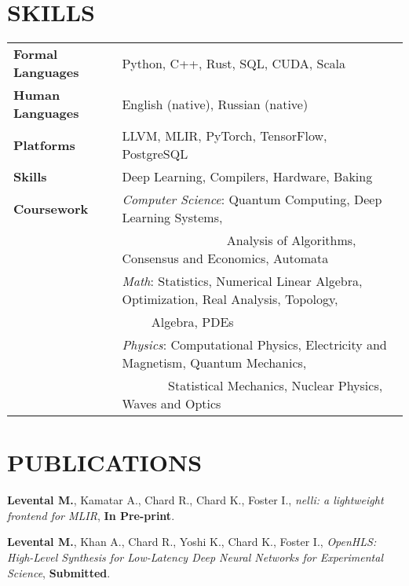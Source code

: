 \documentclass[11pt,letterpaper,roman,colorlinks,linkcolor=blue]{moderncv}
\newcommand*{\modern}{\fontfamily{qhv}\selectfont}
\newcommand{\mystyle}[1]{\textcolor{mygrey}{\modern #1}}
\newcommand{\mysectionstyle}[1]{\large\mystyle{#1}}
\begin{document}
\section{\mysectionstyle{SKILLS}}

\begin{tabular}{ @{} >{\bfseries}l @{\hspace{6ex}} l }
Formal Languages  & Python, C++, Rust, SQL, CUDA, Scala \\
Human Languages  & English (native), Russian (native) \\
Platforms  & LLVM, MLIR, PyTorch, TensorFlow, PostgreSQL \\
Skills     & Deep Learning, Compilers, Hardware, Baking \\
Coursework & \textit{Computer Science}: Quantum Computing, Deep Learning Systems, \\
	   & $\qquad$ $\qquad$ $\qquad$ $\quad$ Analysis of Algorithms, Consensus and Economics, Automata \\
           & \textit{Math}: Statistics, Numerical Linear Algebra, Optimization, Real Analysis, Topology, \\
           & $\qquad$ \hspace{0.5ex} Algebra, PDEs  \\
           & \textit{Physics}: Computational Physics, Electricity and Magnetism, Quantum Mechanics, \\ 
           & $\qquad$ $\quad$ \hspace{0.00ex} Statistical Mechanics, Nuclear Physics, Waves and Optics
\end{tabular}


\section{\mysectionstyle{PUBLICATIONS}}

\begin{hangingpar}
\textbf{Levental M.}, Kamatar A., Chard R., Chard K., Foster I.,
\textit{nelli: a lightweight frontend for MLIR}, 
\textbf{In Pre-print}.
\end{hangingpar}

\begin{hangingpar}
\textbf{Levental M.}, Khan A., Chard R., Yoshi K., Chard K., Foster I.,
\textit{OpenHLS: High-Level Synthesis for Low-Latency Deep Neural Networks for Experimental Science},
\textbf{Submitted}.
\end{hangingpar}
\end{document}
